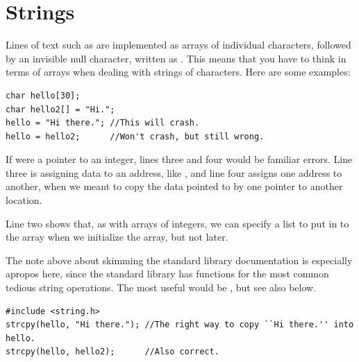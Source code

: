  

\section{Strings}  \label{stringsec}

Lines of text such as  are implemented as arrays of
individual characters, followed by an invisible null character, written
as . This means that you have to think in terms of
arrays when dealing with strings of characters. Here are some examples: 
\lstset{numbers=left, numberstyle=\scshape}
\begin{lstlisting}
char hello[30];
char hello2[] = "Hi.";
hello = "Hi there."; //This will crash.
hello = hello2;      //Won't crash, but still wrong.
\end{lstlisting}
\lstset{numbers=none}

If  were a pointer to an integer, lines three and four
would be familiar errors. Line three is assigning data to an address,
like , and line four assigns one address to another,
when we meant to copy the data pointed to by one pointer to another
location.

Line two shows that, as with arrays of integers, we can specify a list
to put in to the array when we initialize the array, but not later.

The note above about skimming the standard library documentation is
especially apropos here, since the standard library has functions for
the most common tedious string operations. The
most useful would be , but see also  below.
\begin{lstlisting}
#include <string.h>
strcpy(hello, "Hi there."); //The right way to copy ``Hi there.'' into hello.
strcpy(hello, hello2);      //Also correct.
\end{lstlisting}

